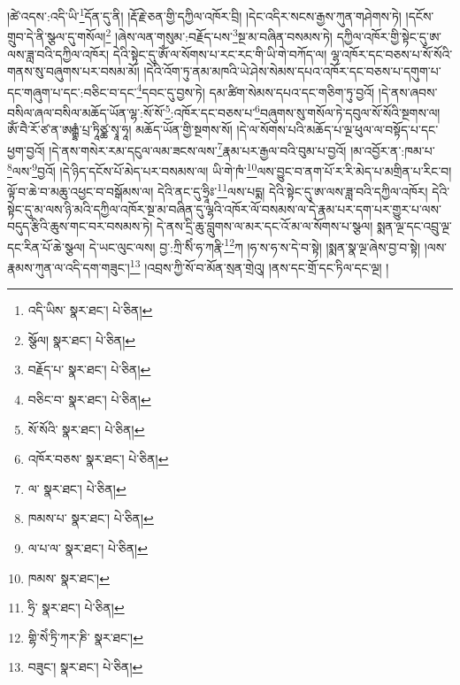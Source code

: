 །ཚེ་འདས་:འདི་ཡི་\footnote{འདི་ཡིས་  སྣར་ཐང་།  པེ་ཅིན། }དོན་དུ་ནི། །རྡོ་རྗེ་ཅན་གྱི་དཀྱིལ་འཁོར་བྲི། །དེང་འདིར་སངས་རྒྱས་ཀུན་གཤེགས་ཏེ། །དངོས་གྲུབ་དེ་ནི་སྩལ་དུ་གསོལ།\footnote{སྩོལ།  སྣར་ཐང་།  པེ་ཅིན། } །ཞེས་ལན་གསུམ་:བརྗོད་པས་\footnote{བརྗོད་པ་  སྣར་ཐང་།  པེ་ཅིན། }སྔ་མ་བཞིན་བསམས་ཏེ། དཀྱིལ་འཁོར་གྱི་སྟེང་དུ་ཨ་ལས་ཟླ་བའི་དཀྱིལ་འཁོར། དེའི་སྟེང་དུ་ཨོཾ་ལ་སོགས་པ་རང་རང་གི་ཡི་གེ་བཀོད་ལ། ལྷ་འཁོར་དང་བཅས་པ་སོ་སོའི་གནས་སུ་བཞུགས་པར་བསམ་མོ། །དེའི་འོག་ཏུ་ནམ་མཁའི་ཡེ་ཤེས་སེམས་དཔའ་འཁོར་དང་བཅས་པ་དགུག་པ་དང་གཞུག་པ་དང་:བཅིང་བ་དང་\footnote{བཅིང་བ་  སྣར་ཐང་།  པེ་ཅིན། }དབང་དུ་བྱས་ཏེ། དམ་ཚིག་སེམས་དཔའ་དང་གཅིག་ཏུ་བྱའོ། །དེ་ནས་ཞབས་བསིལ་ཞལ་བསིལ་མཆོད་ཡོན་ལྷ་:སོ་སོ་\footnote{སོ་སོའི་  སྣར་ཐང་།  པེ་ཅིན། }:འཁོར་དང་བཅས་པ་\footnote{འཁོར་བཅས་  སྣར་ཐང་།  པེ་ཅིན། }བཞུགས་སུ་གསོལ་ཏེ་དབུལ་སོ་སོའི་སྔགས་ལ། ཨོཾ་བཻ་རོ་ཙ་ན་ཨརྒྷཾ་པྲ་ཏཱིཙྪ་སྭཱ་ཧཱ། མཆོད་ཡོན་གྱི་སྔགས་སོ། །དེ་ལ་སོགས་པའི་མཆོད་པ་ལྔ་ཕུལ་ལ་བསྟོད་པ་དང་ཕྱག་བྱའོ། །དེ་ནས་གསེར་རམ་དངུལ་ལམ་ཟངས་ལས་\footnote{ལ་  སྣར་ཐང་།  པེ་ཅིན། }རྣམ་པར་རྒྱལ་བའི་བུམ་པ་བྱའོ། །མ་འབྱོར་ན་:ཁམ་པ་\footnote{ཁམས་པ་  སྣར་ཐང་།  པེ་ཅིན། }ལས་\footnote{ལ་པ་ལ་  སྣར་ཐང་།  པེ་ཅིན། }བྱའོ། །དེ་ཉིད་དངོས་པོ་མེད་པར་བསམས་ལ། ཡི་གེ་ཁཾ་\footnote{ཁམས་  སྣར་ཐང་། }ལས་བྱུང་བ་ནག་པོ་ར་རི་མེད་པ་མགྲིན་པ་རིང་བ། ལྟོ་བ་ཆེ་བ་མཆུ་འཕྱང་བ་བསྒོམས་ལ། དེའི་ནང་དུ་ཧྲཱིཿ་\footnote{ཧྲི་  སྣར་ཐང་།  པེ་ཅིན། }ལས་པདྨ། དེའི་སྟེང་དུ་ཨ་ལས་ཟླ་བའི་དཀྱིལ་འཁོར། དེའི་སྟེང་དུ་མ་ལས་ཉི་མའི་དཀྱིལ་འཁོར་སྔ་མ་བཞིན་དུ་ལྷའི་འཁོར་ལོ་བསམས་ལ་དེ་རྣམ་པར་དག་པར་གྱུར་པ་ལས་བདུད་རྩིའི་ཆུས་གང་བར་བསམས་ཏེ། དེ་ནས་དྲི་ཆུ་བླུགས་ལ་མར་དང་འོ་མ་ལ་སོགས་པ་སྩལ། སྨན་ལྔ་དང་འབྲུ་ལྔ་དང་རིན་པོ་ཆེ་སྩལ། དེ་ཡང་ལུང་ལས། བྱ་:ཀྲི་སིཾ་ཧ་ཀརྣི་\footnote{གྷི་སེཾ་ཏྲི་ཀར་ཎི་  སྣར་ཐང་། }ཀ །ཧ་ས་ཧ་ས་དེ་བ་སྟེ། །སྨན་སྣ་ལྔ་ཞེས་བྱ་བ་སྟེ། །ལས་རྣམས་ཀུན་ལ་འདི་དག་གཟུང་།\footnote{བཟུང་།  སྣར་ཐང་།  པེ་ཅིན། } །འབྲས་ཀྱི་སོ་བ་མོན་སྲན་གྲེའུ། །ནས་དང་གྲོ་དང་ཏིལ་དང་ལྔ། །
